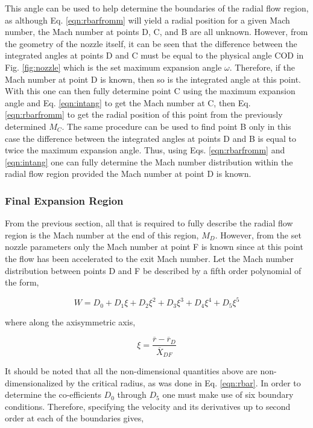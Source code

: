 	This angle can be used to help determine the boundaries of the radial flow region, as
although Eq. \ref{eqn:rbarfromm} will yield a radial position for a given Mach number, the
Mach number at points D, C, and B are all unknown.  However, from the geometry of the nozzle
itself, it can be seen that the difference between the integrated angles
at points D and C must be equal to the physical angle COD in Fig. \ref{fig:nozzle} which is
the set maximum expansion angle $\omega$.  Therefore, if the Mach number at point D is known, then
so is the integrated angle at this point.  With this one can then fully determine point C
using the maximum expansion angle and Eq. \ref{eqn:intang} to get the Mach number at C, then
Eq. \ref{eqn:rbarfromm} to get the radial position of this point from the previously determined
$M_C$.  The same procedure can be used to find point B only in this case the difference 
between the integrated angles at points D and B is equal to twice the maximum expansion 
angle.  Thus, using Eqs. \ref{eqn:rbarfromm} and \ref{eqn:intang} one can fully determine
the Mach number distribution within the radial flow region provided the Mach number at point D
is known.


\subsubsection{Final Expansion Region}

	From the previous section, all that is required to fully describe the radial 
flow region is the Mach number at the end of this region, $M_D$.  However, from the
set nozzle parameters only the Mach number at point F is known since at this point
the flow has been accelerated to the exit Mach number.  Let the Mach number distribution 
between points D and F be described by a fifth order polynomial of the form,

\begin{equation}
	W = D_0 + D_1\xi + D_2\xi^2 + D_3\xi^3 + D_4\xi^4 + D_5\xi^5
\label{eqn:dpoly}
\end{equation}

	where along the axisymmetric axis,

\begin{displaymath}
	\xi = \frac{\overline{r}-\overline{r}_D}{\overline{X}_{DF}}
\end{displaymath}

	It should be noted that all the non-dimensional quantities above are non-dimensionalized
by the critical radius, as was done in Eq. \ref{eqn:rbar}.  In order to determine the 
co-efficients $D_0$ through $D_5$ one must make use of six boundary conditions.  Therefore,
specifying the velocity and its derivatives up to second order at each of the boundaries gives,

